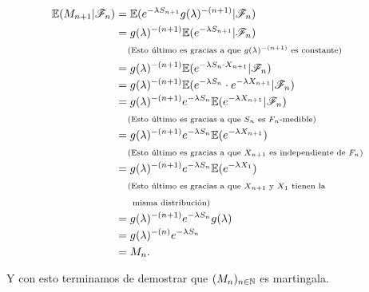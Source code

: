 \begin{itemize}
            \begin{align}
                \mathbb{E}(M_{n+1} | \mathscr{F}_n)      &=      \mathbb{E}(e^{-\lambda S_{n+1}}g(\lambda)^{-(n+1)}|\mathscr{F}_n)                                        \\
                                        &=      g(\lambda)^{-(n+1)}\mathbb{E}(e^{-\lambda S_{n+1}}|\mathscr{F}_n)                                        \\
                                        &\;\;\;\;\mbox{{\scriptsize(Esto último es gracias a que $g(\lambda)^{-(n+1)}$ es constante)}}               		\\
                                        &=      g(\lambda)^{-(n+1)}\mathbb{E}(e^{-\lambda S_{n} \cdot X_{n+1}}|\mathscr{F}_n)                            \\
                                        &=      g(\lambda)^{-(n+1)}\mathbb{E}(e^{-\lambda S_{n}} \cdot e^{-\lambda X_{n+1}}|\mathscr{F}_n)               \\
                                        &=      g(\lambda)^{-(n+1)} e^{-\lambda S_{n}} \mathbb{E}(e^{-\lambda X_{n+1}}|\mathscr{F}_n)                    \\                                       
                                        &\;\;\;\;\mbox{{\scriptsize(Esto último es gracias a que $S_n$ es $F_n$-medible)}}                           		\\
                                        &=      g(\lambda)^{-(n+1)} e^{-\lambda S_{n}} \mathbb{E}(e^{-\lambda X_{n+1}})                         \\
                                        &\;\;\;\;\mbox{{\scriptsize(Esto último es gracias a que $X_{n+1}$ es independiente de $F_n$)}}              		\\
                                        &=      g(\lambda)^{-(n+1)} e^{-\lambda S_{n}} \mathbb{E}(e^{-\lambda X_{1}})                           \\
                                        &\;\;\;\;\mbox{{\scriptsize(Esto último es gracias a que $X_{n+1}$ y $X_1$ tienen la}}                       	    \\ 
                                        &\;\;\;\;\mbox{{\scriptsize\;\;misma distribución)}}   															    \\
                                        &=      g(\lambda)^{-(n+1)} e^{-\lambda S_{n}} g(\lambda)                                       \\
                                        &=      g(\lambda)^{-(n)} e^{-\lambda S_{n}}                                                    \\
                                        &=      M_n.
            \end{align}\pn
    \end{itemize}
    
    Y con esto terminamos de demostrar que $(M_n)_{n \in \mathbb{N}}$ es martingala.